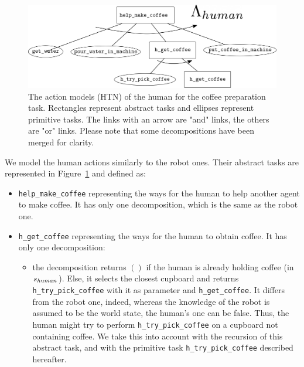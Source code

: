 \documentclass[a4paper,11pt,twoside]{StyleThese}
\begin{document}
\begin{figure}[hbtp]
\centering
\includegraphics[width=\textwidth]{figures/chapter4/HTN_h_coffee.png}
\caption{The action models (HTN) of the human for the coffee preparation task. Rectangles represent abstract tasks and ellipses represent primitive tasks. The links with an arrow are "and" links, the others are "or" links. Please note that some decompositions have been merged for clarity.}
\label{fig:chap4hhtncoffee}
\end{figure}

We model the human actions similarly to the robot ones. Their abstract tasks are represented in Figure~\ref{fig:chap4hhtncoffee} and defined as:
\begin{itemize}
\item \verb'help_make_coffee' representing the ways for the human to help another agent to make coffee. It has only one decomposition, which is the same as the robot one.
\item \verb'h_get_coffee' representing the ways for the human to obtain coffee. It has only one decomposition:
	\begin{itemize}
	\item the decomposition returns $()$ if the human is already holding coffee (in $s_{human}$). Else, it selects the closest cupboard and returns \verb'h_try_pick_coffee' with it as parameter and \verb'h_get_coffee'. It differs from the robot one, indeed, whereas the knowledge of the robot is assumed to be the world state, the human's one can be false. Thus, the human might try to perform \verb'h_try_pick_coffee' on a cupboard not containing coffee. We take this into account with the recursion of this abstract task, and with the primitive task \verb'h_try_pick_coffee' described hereafter.
	\end{itemize}
\end{itemize}
\end{document}
